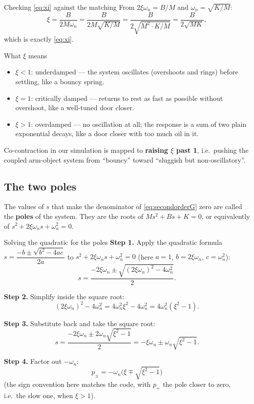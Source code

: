 \documentclass[11pt,a4paper]{article}
\begin{document}
\begin{stepbox}{Checking \eqref{eq:xi} against the matching}
From $2\xi\omega_n = B/M$ and $\omega_n=\sqrt{K/M}$:
\[
\xi = \frac{B}{2M\omega_n} = \frac{B}{2M\sqrt{K/M}} = \frac{B}{2\sqrt{M^2\cdot K/M}}
   = \frac{B}{2\sqrt{MK}},
\]
which is exactly \eqref{eq:xi}.
\end{stepbox}

\begin{examplebox}{What $\xi$ means}
\begin{itemize}[nosep]
\item $\xi<1$: underdamped --- the system oscillates (overshoots and rings)
  before settling, like a bouncy spring.
\item $\xi=1$: critically damped --- returns to rest as fast as possible
  without overshoot, like a well-tuned door closer.
\item $\xi>1$: overdamped --- no oscillation at all; the response is a sum of
  two plain exponential decays, like a door closer with too much oil in it.
\end{itemize}
Co-contraction in our simulation is mapped to \textbf{raising $\xi$ past 1},
i.e.\ pushing the coupled arm-object system from ``bouncy'' toward
``sluggish but non-oscillatory''.
\end{examplebox}

\subsection{The two poles}

The values of $s$ that make the denominator of \eqref{eq:secondorderG} zero
are called the \textbf{poles} of the system. They are the roots of
$Ms^2+Bs+K=0$, or equivalently of $s^2+2\xi\omega_n s+\omega_n^2=0$.

\begin{stepbox}{Solving the quadratic for the poles}
\textbf{Step 1.} Apply the quadratic formula $s=\dfrac{-b\pm\sqrt{b^2-4ac}}{2a}$
to $s^2+2\xi\omega_n s+\omega_n^2=0$ (here $a=1$, $b=2\xi\omega_n$,
$c=\omega_n^2$):
\[
s = \frac{-2\xi\omega_n \pm \sqrt{(2\xi\omega_n)^2 - 4\omega_n^2}}{2}.
\]

\textbf{Step 2.} Simplify inside the square root:
\[
(2\xi\omega_n)^2 - 4\omega_n^2 = 4\omega_n^2\xi^2 - 4\omega_n^2 = 4\omega_n^2(\xi^2-1).
\]

\textbf{Step 3.} Substitute back and take the square root:
\[
s = \frac{-2\xi\omega_n \pm 2\omega_n\sqrt{\xi^2-1}}{2} = -\xi\omega_n \pm \omega_n\sqrt{\xi^2-1}.
\]

\textbf{Step 4.} Factor out $-\omega_n$:
\begin{equation}
\boxed{\; p_\pm = -\omega_n\bigl(\xi \mp \sqrt{\xi^2-1}\bigr)\;}
\label{eq:poles}
\end{equation}
(the sign convention here matches the code, with $p_+$ the pole closer to
zero, i.e.\ the slow one, when $\xi>1$).
\end{stepbox}
\end{document}
